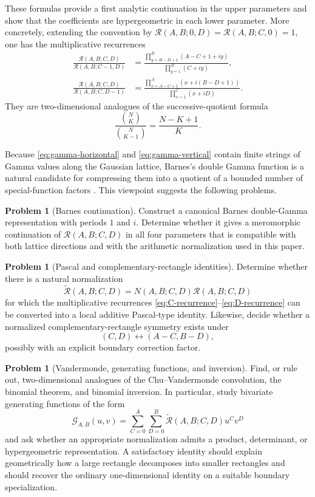 \documentclass[a4paper,american,11pt]{amsart}
\numberwithin{equation}{section}
\theoremstyle{definition}
\newtheorem{problem}[theorem]{Problem}
\newcommand{\Rect}{\mathcal R}
\begin{document}
These formulas provide a first analytic continuation in the upper parameters and show that the coefficients are hypergeometric in each lower parameter. More concretely, extending the convention by $\Rect(A,B;0,D)=\Rect(A,B;C,0)=1$, one has the multiplicative recurrences
\begin{align}
\frac{\Rect(A,B;C,D)}{\Rect(A,B;C-1,D)}
&=
\frac{\displaystyle\prod_{y=B-D+1}^{B}(A-C+1+iy)}
{\displaystyle\prod_{y=1}^{D}(C+iy)},
\label{eq:C-recurrence}\\
\frac{\Rect(A,B;C,D)}{\Rect(A,B;C,D-1)}
&=
\frac{\displaystyle\prod_{x=A-C+1}^{A}(x+i(B-D+1))}
{\displaystyle\prod_{x=1}^{C}(x+iD)}.
\label{eq:D-recurrence}
\end{align}
They are two-dimensional analogues of the successive-quotient formula
\[
\frac{\binom{N}{K}}{\binom{N}{K-1}}
=
\frac{N-K+1}{K}.
\]

Because \eqref{eq:gamma-horizontal} and \eqref{eq:gamma-vertical} contain finite strings of Gamma values along the Gaussian lattice, Barnes's double Gamma function is a natural candidate for compressing them into a quotient of a bounded number of special-function factors \cite{Barnes1899,Barnes1901}. This viewpoint suggests the following problems.

\begin{problem}[Barnes continuation]\label{prob:barnes}
Construct a canonical Barnes double-Gamma representation with periods $1$ and $i$. Determine whether it gives a meromorphic continuation of $\Rect(A,B;C,D)$ in all four parameters that is compatible with both lattice directions and with the arithmetic normalization used in this paper.
\end{problem}

\begin{problem}[Pascal and complementary-rectangle identities]\label{prob:pascal}
Determine whether there is a natural normalization
\[
\widetilde{\Rect}(A,B;C,D)
=
N(A,B;C,D)\Rect(A,B;C,D)
\]
for which the multiplicative recurrences \eqref{eq:C-recurrence}--\eqref{eq:D-recurrence} can be converted into a local additive Pascal-type identity. Likewise, decide whether a normalized complementary-rectangle symmetry exists under
\[
(C,D)\longleftrightarrow(A-C,B-D),
\]
possibly with an explicit boundary correction factor.
\end{problem}

\begin{problem}[Vandermonde, generating functions, and inversion]\label{prob:vandermonde}
Find, or rule out, two-dimensional analogues of the Chu--Vandermonde convolution, the binomial theorem, and binomial inversion. In particular, study bivariate generating functions of the form
\[
\mathcal G_{A,B}(u,v)
=
\sum_{C=0}^{A}\sum_{D=0}^{B}
\widetilde{\Rect}(A,B;C,D)u^Cv^D
\]
and ask whether an appropriate normalization admits a product, determinant, or hypergeometric representation. A satisfactory identity should explain geometrically how a large rectangle decomposes into smaller rectangles and should recover the ordinary one-dimensional identity on a suitable boundary specialization.
\end{problem}
\end{document}
